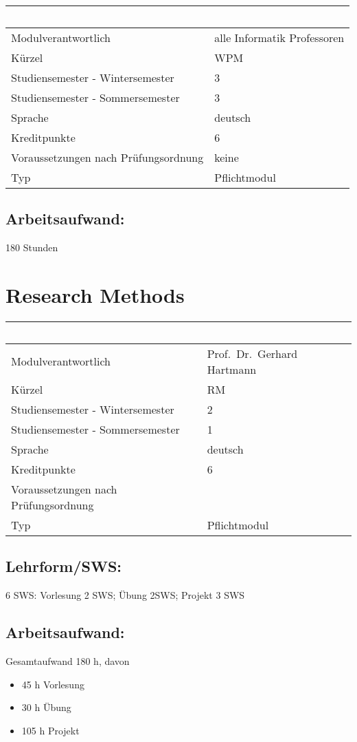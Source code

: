 \begin{longtable}[]{@{}ll@{}}
\toprule
~ & ~\tabularnewline
\midrule
\endhead
Modulverantwortlich & alle Informatik Professoren\tabularnewline
Kürzel & WPM\tabularnewline
Studiensemester - Wintersemester & 3\tabularnewline
Studiensemester - Sommersemester & 3\tabularnewline
Sprache & deutsch\tabularnewline
Kreditpunkte & 6\tabularnewline
Voraussetzungen nach Prüfungsordnung & keine\tabularnewline
Typ & Pflichtmodul\tabularnewline
\bottomrule
\end{longtable}

\section*{Arbeitsaufwand:}\label{arbeitsaufwand-8}

180 Stunden

\chapter{Research Methods}\label{research-methods}

\begin{longtable}[]{@{}ll@{}}
\toprule
~ & ~\tabularnewline
\midrule
\endhead
Modulverantwortlich & Prof.~Dr.~Gerhard Hartmann\tabularnewline
Kürzel & RM\tabularnewline
Studiensemester - Wintersemester & 2\tabularnewline
Studiensemester - Sommersemester & 1\tabularnewline
Sprache & deutsch\tabularnewline
Kreditpunkte & 6\tabularnewline
Voraussetzungen nach Prüfungsordnung &\tabularnewline
Typ & Pflichtmodul\tabularnewline
\bottomrule
\end{longtable}

\section*{Lehrform/SWS:}\label{lehrformsws-3}

6 SWS: Vorlesung 2 SWS; Übung 2SWS; Projekt 3 SWS

\section*{Arbeitsaufwand:}\label{arbeitsaufwand-9}

Gesamtaufwand 180 h, davon

\begin{itemize}
\item
  45 h Vorlesung
\item
  30 h Übung
\item
  105 h Projekt
\end{itemize}

